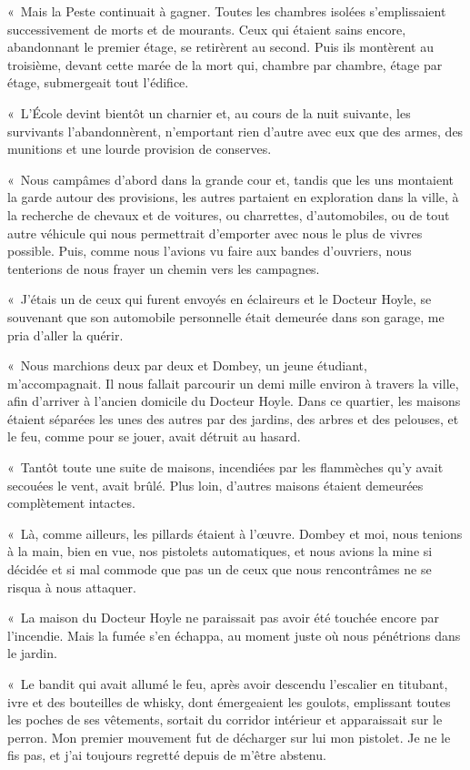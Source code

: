 \documentclass[french,twoside]{book} %
\begin{document}
« Mais la Peste continuait à gagner. Toutes les chambres isolées s’emplissaient successivement de morts et de mourants. Ceux qui étaient sains encore, abandonnant le premier étage, se retirèrent au second. Puis ils montèrent au troisième, devant cette marée de la mort qui, chambre par chambre, étage par étage, submergeait tout l’édifice.\par
« L’École devint bientôt un charnier et, au cours de la nuit suivante, les survivants l’abandonnèrent, n’emportant rien d’autre avec eux que des armes, des munitions et une lourde provision de conserves.\par
« Nous campâmes d’abord dans la grande cour et, tandis que les uns montaient la garde autour des provisions, les autres partaient en exploration dans la ville, à la recherche de chevaux et de voitures, ou charrettes, d’automobiles, ou de tout autre véhicule qui nous permettrait d’emporter avec nous le plus de vivres possible. Puis, comme nous l’avions vu faire aux bandes d’ouvriers, nous tenterions de nous frayer un chemin vers les campagnes.\par
« J’étais un de ceux qui furent envoyés en éclaireurs et le Docteur Hoyle, se souvenant que son automobile personnelle était demeurée dans son garage, me pria d’aller la quérir.\par
« Nous marchions deux par deux et Dombey, un jeune étudiant, m’accompagnait. Il nous fallait parcourir un demi mille environ à travers la ville, afin d’arriver à l’ancien domicile du Docteur Hoyle. Dans ce quartier, les maisons étaient séparées les unes des autres par des jardins, des arbres et des pelouses, et le feu, comme pour se jouer, avait détruit au hasard.\par
« Tantôt toute une suite de maisons, incendiées par les flammèches qu’y avait secouées le vent, avait brûlé. Plus loin, d’autres maisons étaient demeurées complètement intactes.\par
« Là, comme ailleurs, les pillards étaient à l’œuvre. Dombey et moi, nous tenions à la main, bien en vue, nos pistolets automatiques, et nous avions la mine si décidée et si mal commode que pas un de ceux que nous rencontrâmes ne se risqua à nous attaquer.\par
« La maison du Docteur Hoyle ne paraissait pas avoir été touchée encore par l’incendie. Mais la fumée s’en échappa, au moment juste où nous pénétrions dans le jardin.\par
« Le bandit qui avait allumé le feu, après avoir descendu l’escalier en titubant, ivre et des bouteilles de whisky, dont émergeaient les goulots, emplissant toutes les poches de ses vêtements, sortait du corridor intérieur et apparaissait sur le perron. Mon premier mouvement fut de décharger sur lui mon pistolet. Je ne le fis pas, et j’ai toujours regretté depuis de m’être abstenu.\par
\end{document}
